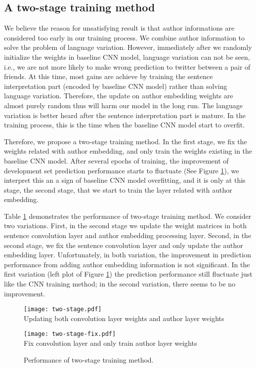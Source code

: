 \subsection{A two-stage training method}
We believe the reason for unsatisfying result is that author informations are considered too early 
in our training process. We combine author information to solve the problem of language variation. 
However, immediately after we randomly initialize the weights in baseline CNN model, language variation 
can not be seen, i.e., we are not more likely to make wrong prediction to twitter between a pair of friends. 
At this time, most gains are achieve by training the sentence interpretation part (encoded by baseline CNN model)
rather than solving language variation. Therefore, the update on author embedding weights are almost purely 
random thus will harm our model in the long run. The language variation is better heard after the sentence 
interpretation part is mature. In the training process, this is the time when the baseline CNN model start to overfit. 

Therefore, we propose a two-stage training method.
In the first stage, we fix the weights related with author embedding, and only train the weights existing in the
baseline CNN model. After several epochs of training, the improvement of development set prediction 
performance starts to fluctuate  (See Figure \ref{Fig:TwoStage}), we interpret this an a sign of baseline 
CNN model overfitting, and it is only at this stage, the second stage, that we start to train the layer related with
author embedding. 

Table \ref{Fig:TwoStage} demonstrates the performance of two-stage training method. We consider two variations. 
First, in the second stage we update the weight matrices in both sentence convolution layer and author embedding
processing layer. Second, in the second stage, we fix the sentence convolution layer and only update the author embedding
layer. Unfortunately, in both variation, the improvement in prediction performance from adding author embedding
information is not significant. In the first variation (left plot of Figure \ref{Fig:TwoStage}) the prediction performance 
still fluctuate just like the CNN training method; in the second variation, there seems to be no improvement. 


\begin{figure}[tbp] %
   \centering
\begin{minipage}{0.5\linewidth}\centering
   \texttt{[image: two-stage.pdf]} 
   \\{\footnotesize Updating both convolution layer weights and author layer weights   }
\end{minipage}
\begin{minipage}{0.49\linewidth}\centering
   \texttt{[image: two-stage-fix.pdf]} 
   \\{\footnotesize Fix convolution layer and only train author layer weights   }
\end{minipage}
\caption{Performance of two-stage training method.}
\label{Fig:TwoStage}
\end{figure}